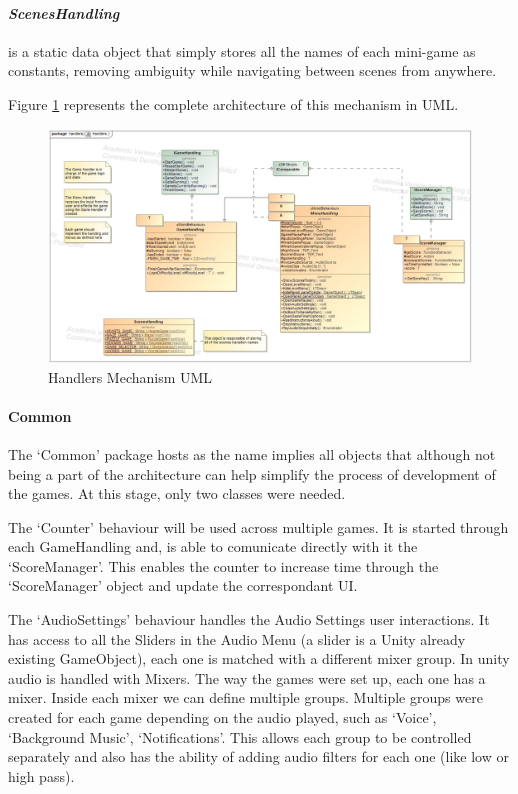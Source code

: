 \paragraph{\textit{ScenesHandling}} is a static data object that simply stores all the names of each mini-game as constants, removing ambiguity while navigating between scenes from anywhere.

Figure \ref{fig:handlers} represents the complete architecture of this mechanism in UML.

\begin{figure}[H]
    \centering
    \includegraphics[width=\linewidth]{Chapters/new_architechture/class__handlers__Handlers.jpg}
    \caption{Handlers Mechanism UML}
    \label{fig:handlers}
\end{figure}

\paragraph{Common}

The `Common' package hosts as the name implies all objects that although not being a part of the architecture can help simplify the process of development of the games. At this stage, only two classes were needed. 

The `Counter' behaviour will be used across multiple games. It is started through each GameHandling and, is able to comunicate directly with it the `ScoreManager'. This enables the counter to increase time through the `ScoreManager' object and update the correspondant UI.

The `AudioSettings' behaviour handles the Audio Settings user interactions. It has access to all the Sliders in the Audio Menu (a slider is a Unity already existing GameObject), each one is matched with a different mixer group. In unity audio is handled with Mixers. The way the games were set up, each one has a mixer. Inside each mixer we can define multiple groups. Multiple groups were created for each game depending on the audio played, such as `Voice', `Background Music', `Notifications'. This allows each group to be controlled separately and also has the ability of adding audio filters for each one (like low or high pass).

